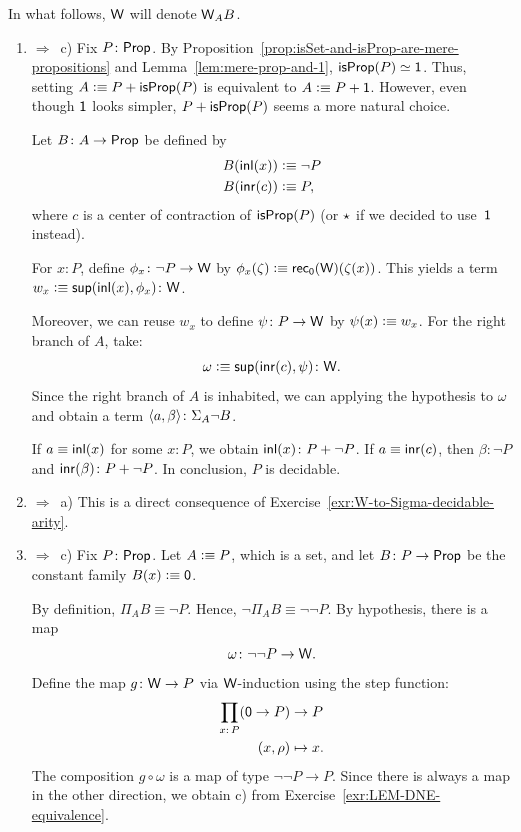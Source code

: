\begin{solution}
    In what follows, $\mathsf{W}$ will denote $\mathsf{W}_AB$.
    \begin{enumerate}
        \item[a)] $\Rightarrow$~c) Fix $P\colon\fun{Prop}$. By Proposition~\ref{prop:isSet-and-isProp-are-mere-propositions} and Lemma~\ref{lem:mere-prop-and-1}, $\mathsf{isProp}(P)\simeq\mathsf{1}$. Thus, setting $A\mathrel{\vcentcolon}\equiv P+\mathsf{isProp}(P)$ is equivalent to $A\mathrel{\vcentcolon}\equiv P+\mathsf{1}$. However, even though $\mathsf{1}$ looks simpler, $P+\mathsf{isProp}(P)$ seems a more natural choice. 
        
        Let $B\colon A\to\fun{Prop}$ be defined by
        \begin{align*}
            B(\mathsf{inl}(x))&\mathrel{\vcentcolon}\equiv\neg P\\
            B(\mathsf{inr}(c))&\mathrel{\vcentcolon}\equiv P,
        \end{align*}
        where $c$ is a center of contraction of $\mathsf{isProp}(P)$ (or ${\mathsf{\star}}$ if we decided to use~$\mathsf{1}$ instead).
        
        For $x\colon P$, define $\phi_x\colon\neg P\to\fun W$ by $\phi_x(\zeta)\mathrel{\vcentcolon}\equiv\mathsf{rec}_{\mathsf{0}}(\mathsf{W})(\zeta(x))$. This yields a term $w_x\defeq\fun{sup}(\fun{inl}(x),\phi_x)\colon\fun W$.
        
        Moreover, we can reuse $w_x$ to define $\psi\colon P\to\fun W$ by $\psi(x)\mathrel{\vcentcolon}\equiv w_x$. For the right branch of $A$, take:
        \[
            \omega\defeq\fun{sup}(\fun{inr}(c),\psi)
                \colon\fun W.
        \]
        Since the right branch of $A$ is inhabited, we can applying the hypothesis to $\omega$ and obtain a term $\dep{a,\beta}\colon\Sigma_A\neg B$. 
        
        If $a\equiv\mathsf{inl}(x)$ for some $x\colon P$, we obtain $\fun{inl}(x)\colon P+\neg P$. If $a\equiv\mathsf{inr}(c)$, then $\beta\colon\neg P$ and $\fun{inr}(\beta)\colon P+\neg P$. In conclusion, $P$ is decidable.
        
        \item[c)] $\Rightarrow$~a) This is a direct consequence of Exercise~\ref{exr:W-to-Sigma-decidable-arity}.

        \item[b)] $\Rightarrow$~c) Fix $P\colon\fun{Prop}$. Let $A\mathrel{\vcentcolon}\equiv P$, which is a set, and let $B\colon P\to\fun{Prop}$ be the constant family $B(x)\mathrel{\vcentcolon}\equiv\mathsf{0}$.
        
        By definition, $\Pi_AB\equiv\neg P$. Hence, $\neg\Pi_AB\equiv\neg\neg P$. 
        By hypothesis, there is a map 
        \[
            \omega\colon\neg\neg P\to\fun W.
        \]
        Define the map $g\colon\fun W\to P$ via $\mathsf{W}$-induction using the step function:
        \begin{align*}
            \prod_{x\colon P}(\fun0\to P)&\to P\\
            (x,\rho)&\mapsto x. 
        \end{align*}
        The composition $g\circ\omega$ is a map of type $\neg\neg P\to P$. Since there is always a map in the other direction, we obtain c) from Exercise~\ref{exr:LEM-DNE-equivalence}.
        

\end{enumerate}
\end{solution}
